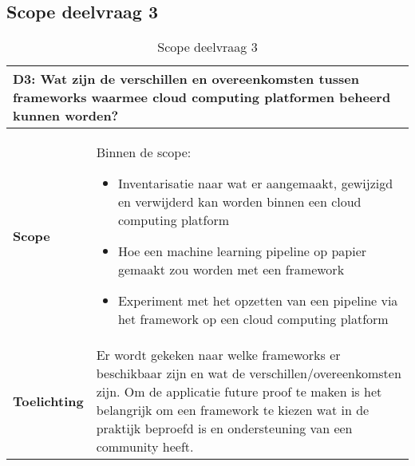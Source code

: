 \subsection*{Scope deelvraag 3}\label{appendix:scope-subquestion-3}
\begin{table}[hbt!]
  \centering
  \begin{tabular}{|p{.215\linewidth}|p{.72\linewidth}|}
  \hline
  \multicolumn{2}{|p{.97\linewidth}|}{\textbf{D3: Wat zijn de verschillen en overeenkomsten tussen frameworks waarmee cloud computing platformen beheerd kunnen worden?}} \\ \hline
    \textbf{Scope}&
      Binnen de scope:
      \begin{itemize}
        \item Inventarisatie naar wat er aangemaakt, gewijzigd en verwijderd kan worden binnen een cloud computing platform
        \item Hoe een machine learning pipeline op papier gemaakt zou worden met een framework
        \item Experiment met het opzetten van een pipeline via het framework op een cloud computing platform
      \end{itemize}
    \\ \hline
    \textbf{Toelichting}&
    Er wordt gekeken naar welke frameworks er beschikbaar zijn en wat de verschillen/overeenkomsten zijn. Om de applicatie future proof te maken is het belangrijk om een framework te kiezen wat in de praktijk beproefd is en ondersteuning van een community heeft.
    \\ \hline
  \end{tabular}
  \caption{Scope deelvraag 3}
  \label{table:scope-subquestion-3}
\end{table}

\newpage

